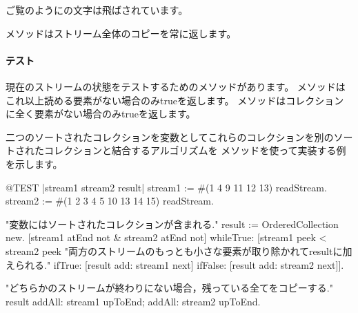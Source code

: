 \documentclass[a4paper,10pt,twoside]{book}
\begin{document}
{%
ご覧のようにの文字は飛ばされています。

メソッドはストリーム全体のコピーを常に返します。

\paragraph{テスト}現在のストリームの状態をテストするためのメソッドがあります。
メソッドはこれ以上読める要素がない場合のみtrueを返します。
メソッドはコレクションに全く要素がない場合のみtrueを返します。

二つのソートされたコレクションを変数としてこれらのコレクションを別のソートされたコレクションと結合するアルゴリズムを
メソッドを使って実装する例を示します。

\begin{code}{@TEST |stream1 stream2 result|}
stream1 := #(1 4 9 11 12 13) readStream.
stream2 := #(1 2 3 4 5 10 13 14 15) readStream.

"変数にはソートされたコレクションが含まれる."
result := OrderedCollection new.
[stream1 atEnd not & stream2 atEnd not]
  whileTrue: [stream1 peek < stream2 peek
    "両方のストリームのもっとも小さな要素が取り除かれてresultに加えられる."
    ifTrue: [result add: stream1 next]
    ifFalse: [result add: stream2 next]].

"どちらかのストリームが終わりにない場合，残っている全てをコピーする."
result
  addAll: stream1 upToEnd;
  addAll: stream2 upToEnd.


\end{code}}
\end{document}
